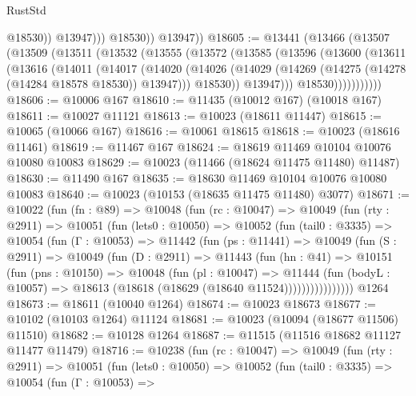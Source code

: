 \begin{lexlean}{RustStd}
\begin{coremodule}
                      @18530))
                  @13947)))
            @18530))
        @13947))
@18605 := @13441
    (@13466
      (@13507
        (@13509
          (@13511
            (@13532
              (@13555
                (@13572
                  (@13585
                    (@13596
                      (@13600
                        (@13611
                          (@13616
                            (@14011
                              (@14017
                                (@14020
                                  (@14026
                                    (@14029
                                      (@14269 (@14275 (@14278 (@14284 @18578 @18530)) @13947)))
                                    @18530))
                                @13947)))
                          @18530)))))))))))
@18606 := @10006 @167
@18610 := @11435 (@10012 @167) (@10018 @167)
@18611 := @10027 @11121
@18613 := @10023 (@18611 @11447)
@18615 := @10065 (@10066 @167)
@18616 := @10061 @18615
@18618 := @10023 (@18616 @11461)
@18619 := @11467 @167
@18624 := @18619 @11469 @10104 @10076 @10080 @10083
@18629 := @10023 (@11466 (@18624 @11475 @11480) @11487)
@18630 := @11490 @167
@18635 := @18630 @11469 @10104 @10076 @10080 @10083
@18640 := @10023 (@10153 (@18635 @11475 @11480) @3077)
@18671 := @10022
    (fun (fn : @89) =>
    @10048
      (fun (rc : @10047) =>
      @10049
        (fun (rty : @2911) =>
        @10051
          (fun (lets0 : @10050) =>
          @10052
            (fun (tail0 : @3335) =>
            @10054
              (fun (Γ : @10053) =>
              @11442
                (fun (ps : @11441) =>
                @10049
                  (fun (S : @2911) =>
                  @10049
                    (fun (D : @2911) =>
                    @11443
                      (fun (hn : @41) =>
                      @10151
                        (fun (pns : @10150) =>
                        @10048
                          (fun (pl : @10047) =>
                          @11444
                            (fun (bodyL : @10057) =>
                            @18613 (@18618 (@18629 (@18640 @11524))))))))))))))))
    @1264
@18673 := @18611 (@10040 @1264)
@18674 := @10023 @18673
@18677 := @10102 (@10103 @1264) @11124
@18681 := @10023 (@10094 (@18677 @11506) @11510)
@18682 := @10128 @1264
@18687 := @11515 (@11516 @18682 @11127 @11477 @11479)
@18716 := @10238
    (fun (rc : @10047) =>
    @10049
      (fun (rty : @2911) =>
      @10051
        (fun (lets0 : @10050) =>
        @10052
          (fun (tail0 : @3335) =>
          @10054
            (fun (Γ : @10053) =>

\end{coremodule}
\end{lexlean}
